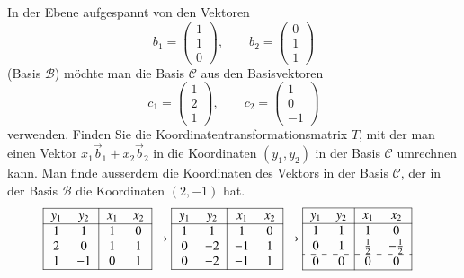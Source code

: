 \begin{beispiel}
In der Ebene aufgespannt von den Vektoren
\[
b_1=\begin{pmatrix}1\\1\\0 \end{pmatrix}
,\qquad
b_2=\begin{pmatrix}0\\1\\1 \end{pmatrix}
\]
(Basis $\mathcal{B}$)
möchte man die Basis $\mathcal{C}$ aus den Basisvektoren
\[
c_1=\begin{pmatrix}1\\2\\1\end{pmatrix}
,\qquad
c_2=\begin{pmatrix}1\\0\\-1\end{pmatrix}
\]
verwenden.
Finden Sie die Koordinatentransformationsmatrix $T$, mit der
man einen Vektor $x_1\vec{b}_1+x_2\vec{b}_2$
in die Koordinaten $(y_1,y_2)$ in
der Basis $\mathcal{C}$ umrechnen kann.
Man finde ausserdem die Koordinaten des Vektors in der Basis $\mathcal{C}$,
der in der Basis $\mathcal{B}$ die Koordinaten $(2,-1)$ hat.
\begin{align*}
\begin{tabular}{|>{$}c<{$}>{$}c<{$}|>{$}c<{$}>{$}c<{$}|}
\hline
y_1&y_2&x_1&x_2\\
\hline
1& 1&1&0\\
2& 0&1&1\\
1&-1&0&1\\
\hline
\end{tabular}
&\rightarrow
\begin{tabular}{|>{$}c<{$}>{$}c<{$}|>{$}c<{$}>{$}c<{$}|}
\hline
y_1&y_2&x_1&x_2\\
\hline
1& 1& 1&0\\
0&-2&-1&1\\
0&-2&-1&1\\
\hline
\end{tabular}
\rightarrow
\begin{tabular}{|>{$}c<{$}>{$}c<{$}|>{$}c<{$}>{$}c<{$}|}
\hline
y_1&y_2&x_1&x_2\\
\hline
1& 1&      1&       0\\
0& 1&\frac12&-\frac12\\
\hdashline
0& 0&      0&       0\\
\hline
\end{tabular}

\end{align*}
\end{beispiel}
